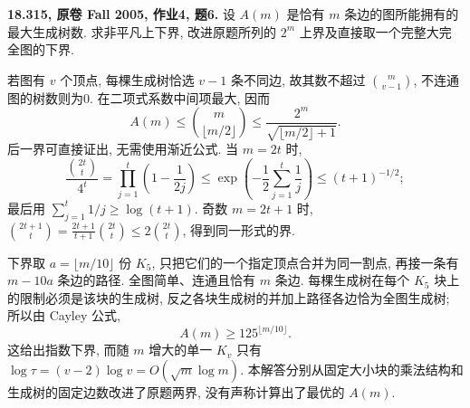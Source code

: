 \begin{exercise}\label{mit:18315-hw4-q6}
\textbf{18.315, 原卷 Fall 2005, 作业4, 题6.}
设 $A(m)$ 是恰有 $m$ 条边的图所能拥有的最大生成树数.
求非平凡上下界, 改进原题所列的 $2^m$ 上界及直接取一个完整大完全图的下界.
\end{exercise}
\begin{solution}
若图有 $v$ 个顶点, 每棵生成树恰选 $v-1$ 条不同边,
故其数不超过 $\binom m{v-1}$, 不连通图的树数则为0.
在二项式系数中间项最大, 因而
\[
A(m)\le\binom m{\lfloor m/2\rfloor}
\le\frac{2^m}{\sqrt{\lfloor m/2\rfloor+1}}.
\]
后一界可直接证出, 无需使用渐近公式.
当 $m=2t$ 时,
\[
\frac{\binom{2t}t}{4^t}
=\prod_{j=1}^t\left(1-\frac1{2j}\right)
\le\exp\!\left(-\frac12\sum_{j=1}^t\frac1j\right)
\le(t+1)^{-1/2};
\]
最后用 $\sum_{j=1}^t1/j\ge\log(t+1)$.
奇数 $m=2t+1$ 时,
$\binom{2t+1}t=\frac{2t+1}{t+1}\binom{2t}t\le2\binom{2t}t$,
得到同一形式的界.

下界取 $a=\lfloor m/10\rfloor$ 份 $K_5$, 只把它们的一个指定顶点合并为同一割点,
再接一条有 $m-10a$ 条边的路径. 全图简单、连通且恰有 $m$ 条边.
每棵生成树在每个 $K_5$ 块上的限制必须是该块的生成树,
反之各块生成树的并加上路径各边恰为全图生成树;
所以由 Cayley 公式,
\[
A(m)\ge125^{\lfloor m/10\rfloor}.
\]
这给出指数下界, 而随 $m$ 增大的单一 $K_v$ 只有
$\log\tau=(v-2)\log v=O(\sqrt m\log m)$.
本解答分别从固定大小块的乘法结构和生成树的固定边数改进了原题两界,
没有声称计算出了最优的 $A(m)$.
\end{solution}

